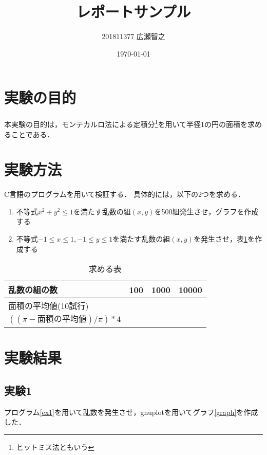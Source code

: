 \documentclass[a4paper,titlepage]{jlreq}
\title{レポートサンプル}
\author{201811377 広瀬智之}
\date{\today}
\begin{document}
\maketitle

\section{実験の目的}
本実験の目的は，モンテカルロ法による定積分\footnote{ヒットミス法ともいう}を用いて半径1の円の面積を求めることである．

\section{実験方法}
C言語のプログラムを用いて検証する．
具体的には，以下の2つを求める．

\begin{enumerate}
    \item{不等式$x^{2}+y^{2}\leq1$を満たす乱数の組$(x,y)$を500組発生させ，グラフを作成する}
    \item{不等式$-1\leq x \leq1, -1\leq y \leq1$を満たす乱数の組$(x,y)$を発生させ，表\ref{tab}を作成する}
\end{enumerate}

\begin{table}[H]
\begin{center}
\caption{求める表}
\begin{tabular}{|l|c|c|c|}
\hline
乱数の組の数               & 100 & 1000 & 10000 \\ \hline
面積の平均値(10試行)         &     &      &       \\ \hline
$((\pi - 面積の平均値) / \pi) * 4$ &     &      &       \\ \hline
\end{tabular}
\label{tab}
\end{center}
\end{table}

\section{実験結果}
\subsection{実験1}
プログラム\ref{ex1}を用いて乱数を発生させ，gnuplotを用いてグラフ\ref{graph}を作成した．

\end{document}
